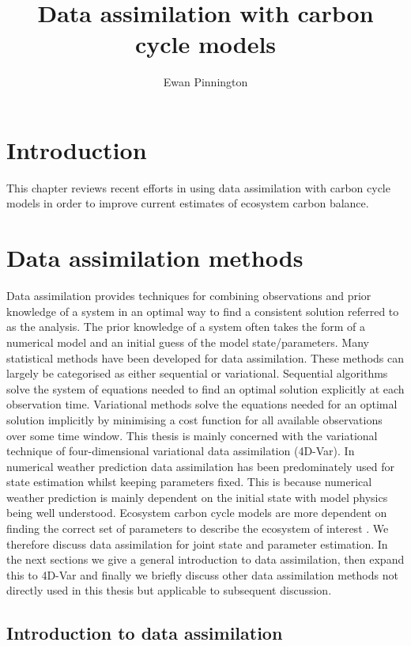 \documentclass[12pt]{article}
\title{Data assimilation with carbon cycle models}
\author{Ewan Pinnington}
\begin{document}
\maketitle

\section{Introduction}

This chapter reviews recent efforts in using data assimilation with carbon cycle models in order to improve current estimates of ecosystem carbon balance.

\section{Data assimilation methods}

Data assimilation provides techniques for combining observations and prior knowledge of a system in an optimal way to find a consistent solution referred to as the analysis. The prior knowledge of a system often takes the form of a numerical model and an initial guess of the model state/parameters. Many statistical methods have been developed for data assimilation. These methods can largely be categorised as either sequential or variational. Sequential algorithms solve the system of equations needed to find an optimal solution explicitly at each observation time. Variational methods solve the equations needed for an optimal solution implicitly by minimising a cost function for all available observations over some time window. This thesis is mainly concerned with the variational technique of four-dimensional variational data assimilation (4D-Var). In numerical weather prediction data assimilation has been predominately used for state estimation whilst keeping parameters fixed. This is because numerical weather prediction is mainly dependent on the initial state with model physics being well understood. Ecosystem carbon cycle models are more dependent on finding the correct set of parameters to describe the ecosystem of interest \citep{luo2015predictability}. We therefore discuss data assimilation for joint state and parameter estimation. In the next sections we give a general introduction to data assimilation, then expand this to 4D-Var and finally we briefly discuss other data assimilation methods not directly used in this thesis but applicable to subsequent discussion. 

\subsection{Introduction to data assimilation}
\end{document}
